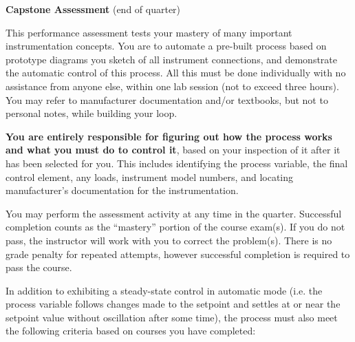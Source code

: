 

\noindent
{\bf Capstone Assessment} (end of quarter)

\vskip 10pt

This performance assessment tests your mastery of many important instrumentation concepts.  You are to automate a pre-built process based on prototype diagrams you sketch of all instrument connections, and demonstrate the automatic control of this process.  All this must be done individually with no assistance from anyone else, within one lab session (not to exceed three hours).  You may refer to manufacturer documentation and/or textbooks, but not to personal notes, while building your loop. 

\vskip 10pt

{\bf You are entirely responsible for figuring out how the process works and what you must do to control it}, based on your inspection of it after it has been selected for you.  This includes identifying the process variable, the final control element, any loads, instrument model numbers, and locating manufacturer's documentation for the instrumentation.

\vskip 10pt

You may perform the assessment activity at any time in the quarter.  Successful completion counts as the ``mastery'' portion of the course exam(s).  If you do not pass, the instructor will work with you to correct the problem(s).  There is no grade penalty for repeated attempts, however successful completion is required to pass the course.

\vskip 10pt

In addition to exhibiting a steady-state control in automatic mode (i.e. the process variable follows changes made to the setpoint and settles at or near the setpoint value without oscillation after some time), the process must also meet the following criteria based on courses you have completed:

